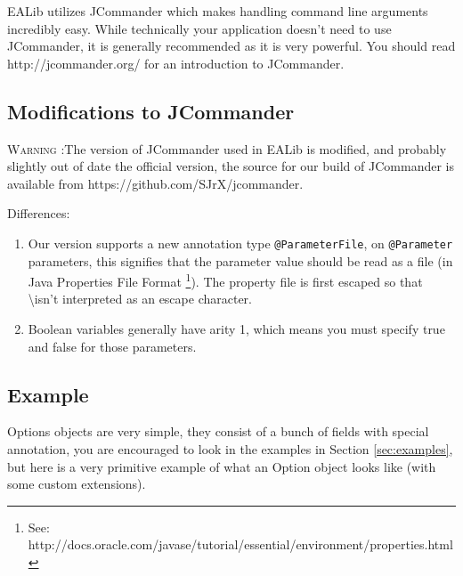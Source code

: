 \documentclass[11pt,letterpaper,oneside]{article}
\begin{document}
EALib utilizes JCommander which makes handling command line arguments incredibly easy. While technically your application doesn't need to use JCommander, it is generally recommended as it is very powerful. You should read http://jcommander.org/ for an introduction to JCommander.





\subsection{Modifications to JCommander}

{\Large \textsc{Warning} }:The version of JCommander used in EALib is modified, and probably slightly out of date the official version, the source for our build of JCommander is available from https://github.com/SJrX/jcommander.

Differences:
\begin{enumerate}
\item Our version supports a new annotation type \texttt{@ParameterFile}, on \texttt{@Parameter} parameters, this signifies that the parameter value should be read as a file (in Java Properties File Format \footnote{See: http://docs.oracle.com/javase/tutorial/essential/environment/properties.html}). The property file is first escaped so that \textbackslash isn't interpreted as an escape character. 

\item Boolean variables generally have arity 1, which means you must specify true and false for those parameters.
\end{enumerate}

\subsection{Example}

Options objects are very simple, they consist of a bunch of fields with special annotation, you are encouraged to look in the examples in Section \ref{sec:examples}, but here is a very primitive example of what an Option object looks like (with some custom extensions).


  
 
\end{document}
